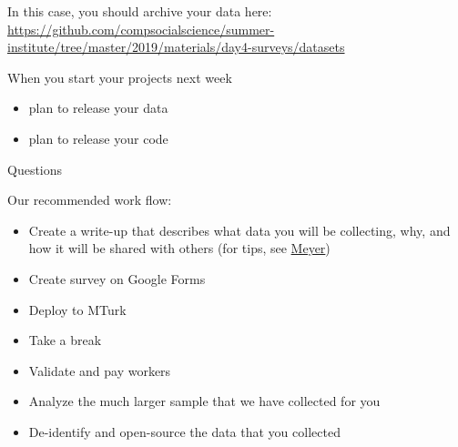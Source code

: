 \documentclass[aspectratio=169]{beamer}
\begin{document}
\begin{frame}

In this case, you should archive your data here:\\
\url{https://github.com/compsocialscience/summer-institute/tree/master/2019/materials/day4-surveys/datasets}

\end{frame}
\begin{frame}

When you start your projects next week
\begin{itemize}
\item plan to release your data
\item plan to release your code
\end{itemize}

\end{frame}
\begin{frame}

\begin{center}
\LARGE Questions
\end{center}

\end{frame}
\begin{frame}

Our recommended work flow:
\begin{itemize}
\item Create a write-up that describes what data you will be collecting, why, and how it will be shared with others (for tips, see \href{https://doi.org/10.1177/2515245917747656}{Meyer})
\item Create survey on Google Forms
\item Deploy to MTurk
\item Take a break
\item Validate and pay workers
\item Analyze the much larger sample that we have collected for you
\item De-identify and open-source the data that you collected
\end{itemize}

\end{frame}
\end{document}

